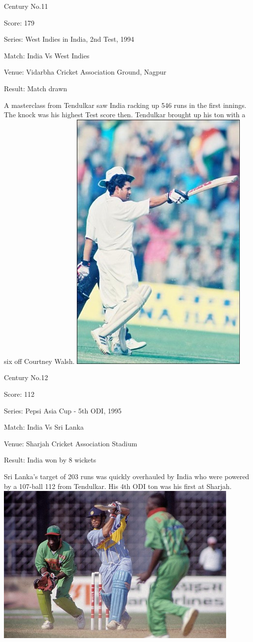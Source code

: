 \documentclass[11pt, a4paper]{article}
\begin{document}
Century No.11 

Score: 179 

Series: West Indies in India, 2nd Test, 1994 

Match: India Vs West Indies 

Venue: Vidarbha Cricket Association Ground, Nagpur 

Result: Match drawn 

A masterclass from Tendulkar saw India racking up 546 runs in the first innings. The knock was his highest Test score then. Tendulkar brought up his ton with a six off Courtney Walsh.
\newpage
\includegraphics[height=0.8\textheight]{pics/12.jpg}

Century No.12 

Score: 112 

Series: Pepsi Asia Cup - 5th ODI, 1995 

Match: India Vs Sri Lanka 

Venue: Sharjah Cricket Association Stadium 

Result: India won by 8 wickets 

Sri Lanka's target of 203 runs was quickly overhauled by India who were powered by a 107-ball 112 from Tendulkar. His 4th ODI ton was his first at Sharjah.
\newpage
\includegraphics[width=0.9\textwidth]{pics/13.jpg}
\end{document}
